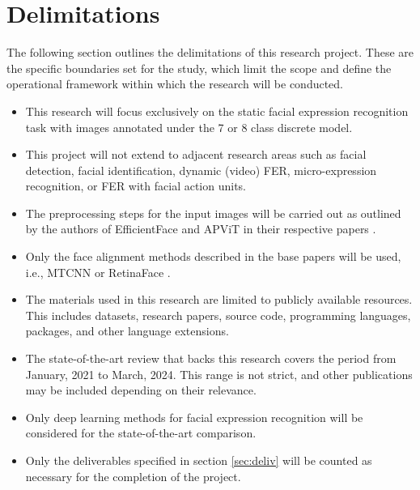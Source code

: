 \documentclass[../main.tex]{subfiles}
\begin{document}
\section{Delimitations}

The following section outlines the delimitations of this research project. These are the specific boundaries set for the study, which limit the scope and define the operational framework within which the research will be conducted. 

\begin{itemize} 

\item This research will focus exclusively on the static facial expression recognition task with images annotated under the 7 or 8 class discrete model.

\item This project will not extend to adjacent research areas such as facial detection, facial identification, dynamic (video) FER, micro-expression recognition, or FER with facial action units.

\item The preprocessing steps for the input images will be carried out as outlined by the authors of EfficientFace and APViT in their respective papers \cite{eff-face2021, apvit2023}.

\item Only the face alignment methods described in the base papers \cite{eff-face2021, apvit2023} will be used, i.e., MTCNN \cite{mtcnn2016} or RetinaFace \cite{retinaface2020}.

\item The materials used in this research are limited to publicly available resources. This includes datasets, research papers, source code, programming languages,  packages, and other language extensions.

\item The state-of-the-art review that backs this research covers the period from January, 2021 to  March, 2024. This range is not strict, and other publications may be included depending on their relevance.

\item Only deep learning methods for facial expression recognition will be considered for the state-of-the-art comparison.

\item Only the deliverables specified in section \ref{sec:deliv} will be counted as necessary for the completion of the project.

\end{itemize}
\end{document}
